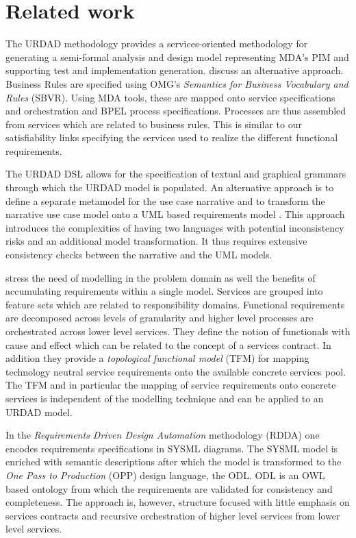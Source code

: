 \section{Related work \label{sec:relatedWork}}

The URDAD methodology provides a services-oriented methodology for generating a semi-formal analysis and design model representing MDA's PIM and supporting test and implementation generation. \cite{iacob_model-driven_2008} discuss an alternative approach. Business Rules are specified using OMG's {\em Semantics for Business Vocabulary and Rules} (SBVR). Using MDA tools, these are mapped onto service specifications and orchestration and BPEL process specifications. Processes are thus assembled from services which are related to business rules. This is similar to our satisfiability links specifying the services used to realize the different functional requirements.

The URDAD DSL allows for the specification of textual and graphical grammars through which the URDAD model is populated. An alternative approach is to define a separate metamodel for the use case narrative and to transform the narrative use case model onto a UML based requirements model \cite{hoffmann_towards_2009,osis_transforming_2010}. This approach introduces the complexities of having two languages with potential inconsistency risks and an additional model transformation. It thus requires extensive consistency checks between the narrative and the UML models.

\cite{asnina_computation_2010} stress the need of modelling in the problem domain as well the benefits of accumulating requirements within a single model. Services are grouped into feature sets which are related to responsibility domains. Functional requirements are decomposed across levels of granularity and higher level processes are orchestrated across lower level services. They define the notion of functionals with cause and effect which can be related to the concept of a services contract. In addition they provide a {\em topological functional model} (TFM) for mapping technology neutral service requirements onto the available concrete services pool. The TFM and in particular the mapping of service requirements onto concrete services is independent of the modelling technique and can be applied to an URDAD model. 

In the {\em Requirements Driven Design Automation} methodology (RDDA) \cite{cardei_model_2008} one encodes requirements specifications in SYSML diagrams. The SYSML model is enriched with semantic descriptions after which the model is transformed to the {\em One Pass to Production} (OPP) design language, the ODL. ODL is an OWL based ontology from which the requirements are validated for consistency and completeness. The approach is, however, structure focused with little emphasis on services contracts and recursive orchestration of higher level services from lower level services.

